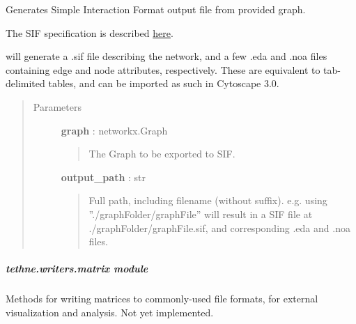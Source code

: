 \documentclass[letterpaper,10pt,english]{sphinxmanual}
\begin{document}

\begin{fulllineitems}
\label{tethne.writers.graph:tethne.writers.graph.to_sif}
Generates Simple Interaction Format output file from provided graph.

The SIF specification is described 
\href{http://wiki.cytoscape.org/Cytoscape\_User\_Manual/Network\_Formats}{here}.

{\hyperref[tethne.writers.graph:tethne.writers.graph.to_sif]{}} will generate a .sif file describing the network, and a few
.eda and .noa files containing edge and node attributes, respectively. These
are equivalent to tab-delimited tables, and can be imported as such in
Cytoscape 3.0.
\begin{quote}\begin{description}
\item[{Parameters}] \leavevmode
\textbf{graph} : networkx.Graph
\begin{quote}

The Graph to be exported to SIF.
\end{quote}

\textbf{output\_path} : str
\begin{quote}

Full path, including filename (without suffix).
e.g. using ''./graphFolder/graphFile'' will result in a SIF file at
./graphFolder/graphFile.sif, and corresponding .eda and .noa files.
\end{quote}

\end{description}\end{quote}

\end{fulllineitems}


\begin{fulllineitems}
\label{tethne.writers.graph:tethne.writers.graph.to_table}
\end{fulllineitems}



\subparagraph{tethne.writers.matrix module}
\label{tethne.writers.matrix:tethne-writers-matrix-module}\label{tethne.writers.matrix::doc}\label{tethne.writers.matrix:module-tethne.writers.matrix}
Methods for writing matrices to commonly-used file formats, for external
visualization and analysis. Not yet implemented.
\end{document}
